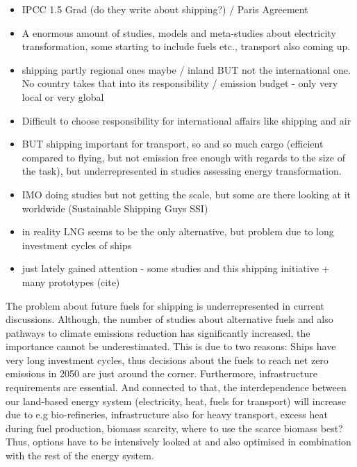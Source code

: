 \documentclass[article]{elsarticle}
\begin{document}
\begin{itemize}
    \item IPCC 1.5 Grad (do they write about shipping?) / Paris Agreement
    \item A enormous amount of studies, models and meta-studies about electricity transformation, some starting to include fuels etc., transport also coming up.
    \item shipping partly regional ones maybe / inland BUT not the international one. No country takes that into its responsibility / emission budget - only very local or very global
    \item Difficult to choose responsibility for international affairs like shipping and air
    \item BUT shipping important for transport, so and so much cargo (efficient compared to flying, but not emission free enough with regards to the size of the task), but underrepresented in studies assessing energy transformation.
    \item IMO doing studies but not getting the scale, but some are there looking at it worldwide (Sustainable Shipping Guys SSI) 
    \item in reality LNG seems to be the only alternative, but problem due to long investment cycles of ships
    \item just lately gained attention - some studies and this shipping initiative + many prototypes (cite)
\end{itemize}

The problem about future fuels for shipping is underrepresented in current discussions. Although, the number of studies about alternative fuels and also pathways to climate emissions reduction has significantly increased, the importance cannot be underestimated. This is due to two reasons: Ships have very long investment cycles, thus decisions about the fuels to reach net zero emissions in 2050 are just around the corner. Furthermore, infrastructure requirements are essential. And connected to that, the interdependence between our land-based energy system (electricity, heat, fuels for transport) will increase due to e.g bio-refineries, infrastructure also for heavy transport, excess heat during fuel production, biomass scarcity, where to use the scarce biomass best? Thus, options have to be intensively looked at and also optimised in combination with the rest of the energy system. 
\end{document}
